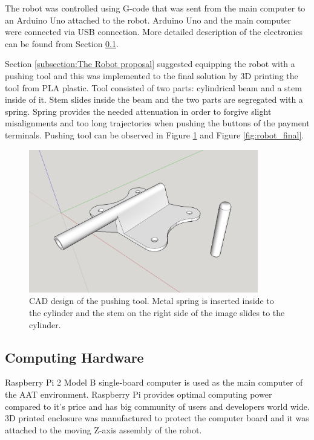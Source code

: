 The robot was controlled using G-code that was sent from the main computer to an Arduino Uno attached to the robot. Arduino Uno and the main computer were connected via USB connection. More detailed description of the electronics can be found from Section \ref{subsection:Computing hardware}.

Section \ref{subsection:The Robot proposal} suggested equipping the robot with a pushing tool and this was implemented to the final solution by 3D printing the tool from PLA plastic. Tool consisted of two parts: cylindrical beam and a stem inside of it. Stem slides inside the beam and the two parts are segregated with a spring. Spring provides the needed attenuation in order to forgive slight misalignments and too long trajectories when pushing the buttons of the payment terminals. Pushing tool can be observed in Figure \ref{fig:pushing_tool} and Figure \ref{fig:robot_final}.

\begin{figure}[ht]
  \begin{center}
    \includegraphics[width=10cm]{images/pushing_tool.png}
    \caption{CAD design of the pushing tool. Metal spring is inserted inside to the cylinder and the stem on the right side of the image slides to the cylinder.}
    \label{fig:pushing_tool}
  \end{center}
\end{figure}
\FloatBarrier

\subsection{Computing Hardware}
\label{subsection:Computing hardware}

Raspberry Pi 2 Model B single-board computer is used as the main computer of the AAT environment. Raspberry Pi provides optimal computing power compared to it's price and has big community of users and developers world wide. 3D printed enclosure was manufactured to protect the computer board and it was attached to the moving Z-axis assembly of the robot.

